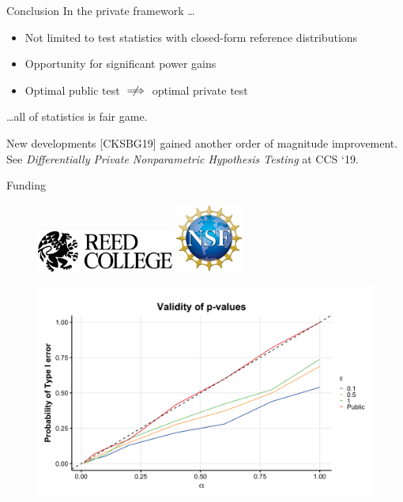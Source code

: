 \documentclass{beamer}
\begin{document}
\begin{frame}{Conclusion}
\pause
\large In the private framework \ldots \par \pause
 \normalsize
\begin{itemize}
	\item Not limited to test statistics with closed-form reference distributions \pause
	\item Opportunity for significant power gains \pause
	\item Optimal public test $\centernot \implies$ optimal private test \pause
\end{itemize}

\large \ldots all of statistics is fair game. \pause
 \normalsize
 
 \begin{block}{New developments}
[CKSBG19] gained another order of magnitude improvement. See \textit{Differentially Private Nonparametric Hypothesis Testing} at CCS `19.
 \end{block} \pause
Funding
\begin{figure}
\includegraphics[width=0.4\textwidth]{images/reed-logo}%
\includegraphics[width=0.2\textwidth]{images/NSF-logo}
\end{figure}

\end{frame}

\begin{frame}

\end{frame}

\begin{frame}{}
\begin{figure}
\includegraphics[scale=0.13]{images/valid-pvals}
\end{figure}
\end{frame}
\end{document}
